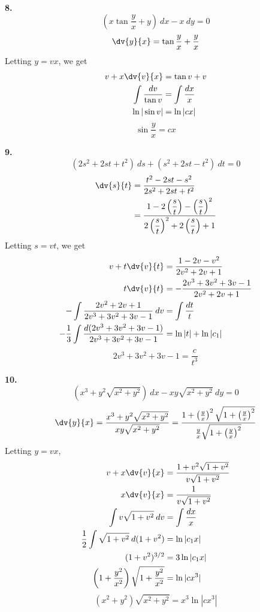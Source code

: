 \begin{exercise}
\begin{multicols}{2}
        \columnbreak

        \textbf{8.}
        \[ \left( x\tan \frac{y}{x} + y \right) \: d{x} - x \: d{y} = 0 \]
        \[ \dv{y}{x} = \tan \frac{y}{x} + \frac{y}{x} \]
        Letting $y = vx$, we get
        \begin{align*}
            v + x\dv{v}{x} &= \tan v + v \\
            \int{\frac{dv}{\tan v}} &= \int{\frac{dx}{x}} \\
            \ln|\sin v| &= \ln|cx|
        \end{align*}
        \[ \boxed{\sin \frac{y}{x} = cx} \]
    \end{multicols}
      \textbf{9.}
        \[ (2s^2+2st+t^2) \: d{s} + (s^2+2st-t^2) \: d{t} = 0 \]
        \begin{align*}
            \dv{s}{t} &= \frac{t^2 - 2st - s^2}{2s^2 + 2st + t^2} \\
            &= \frac{1 - 2\left(\dfrac{s}{t}\right) - \left(\dfrac{s}{t}\right)^2}{2\left(\dfrac{s}{t}\right)^2 + 2\left(\dfrac{s}{t}\right) + 1} \\
        \end{align*}
        Letting $s = vt$, we get
        \begin{align*}
            v + t\dv{v}{t} &= \frac{1-2v-v^2}{2v^2+2v+1} \\
            t\dv{v}{t} &= -\frac{2v^3+3v^2+3v-1}{2v^2+2v+1} \\
            -\int{\frac{2v^2+2v+1}{2v^3+3v^2+3v-1}} \: d{v} &= \int{\frac{dt}{t}} \\
            -\frac{1}{3} \int{\frac{d(2v^3+3v^2+3v-1)}{2v^3+3v^2+3v-1}} &= \ln|t| + \ln|c_1|
        \end{align*}
        \[ \boxed{2v^3 + 3v^2 + 3v -1 = \frac{c}{t^3}} \]

    \textbf{10.}
    \[ (x^3+y^2 \sqrt{x^2+y^2}) \: d{x} - xy \sqrt{x^2+y^2} \: d{y} = 0 \]
    \[ \dv{y}{x} = \frac{x^3+y^2 \sqrt{x^2+y^2}}{xy \sqrt{x^2+y^2}} = \frac{1+\left(\frac{y}{x}\right)^2 \sqrt{1 + \left(\frac{y}{x}\right)^2}}{\frac{y}{x}\sqrt{1+\left(\frac{y}{x}\right)^2}} \]
    Letting $y = vx$,
    \begin{align*}
        v + x \dv{v}{x} &= \frac{1 + v^2 \sqrt{1+v^2}}{v \sqrt{1+v^2}} \\
        x\dv{v}{x} &= \frac{1}{v \sqrt{1+v^2}} \\
        \int{v \sqrt{1+v^2}} \: d{v} &= \int{\frac{dx}{x}} \\
        \frac{1}{2} \int{\sqrt{1+v^2}} \: d{(1+v^2)} &= \ln|c_1x| \\
        (1+v^2)^{3/2} &= 3\ln|c_1x| \\
        \left( 1+\frac{y^2}{x^2} \right)\sqrt{1 + \frac{y^2}{x^2}} &= \ln|cx^3|
    \end{align*}
    \[ \boxed{(x^2+y^2)\sqrt{x^2+y^2} = x^3\ln|cx^3|} \]


\end{exercise}
